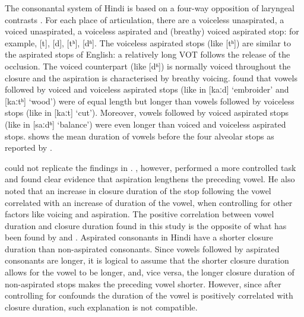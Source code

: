 \documentclass[11pt,a4paper,openany]{memoir}\usepackage[]{graphicx}\usepackage[]{color}
\begin{document}
The consonantal system of Hindi is based on a four-way opposition of laryngeal contrasts \citep{ohala1983}.
For each place of articulation, there are a voiceless unaspirated, a voiced unaspirated, a voiceless aspirated and (breathy) voiced aspirated stop: for example, [t], [d], [tʰ], [dʱ].
The voiceless aspirated stops (like [tʰ]) are similar to the aspirated stops of English: a relatively long VOT follows the release of the occlusion.
The voiced counterpart (like [dʱ]) is normally voiced throughout the closure and the aspiration is characterised by breathy voicing.
\citet{maddieson1976} found that vowels followed by voiced and voiceless aspirated stops (like in [kaːd] `embroider' and [kaːtʰ] `wood') were of equal length but longer than vowels followed by voiceless stops (like in [kaːt] `cut').
Moreover, vowels followed by voiced aspirated stops (like in [saːdʱ] `balance') were even longer than voiced and voiceless aspirated stops.
 shows the mean duration of vowels before the four alveolar stops as reported by \citet[47]{maddieson1976}.


\citet{lampp2004} could not replicate the findings in \citet{maddieson1976}.
\citet{durvasula2012}, however, performed a more controlled task and found clear evidence that aspiration lengthens the preceding vowel.
He also noted that an increase in closure duration of the stop following the vowel correlated with an increase of duration of the vowel, when controlling for other factors like voicing and aspiration.
The positive correlation between vowel duration and closure duration found in this study is the opposite of what has been found by \citet{maddieson1976} and \citet{lampp2004}.
Aspirated consonants in Hindi have a shorter closure duration than non-aspirated consonants.
Since vowels followed by aspirated consonants are longer, it is logical to assume that the shorter closure duration allows for the vowel to be longer, and, vice versa, the longer closure duration of non-aspirated stops makes the preceding vowel shorter.
However, since after controlling for confounds the duration of the vowel is positively correlated with closure duration, such explanation is not compatible.
\end{document}
